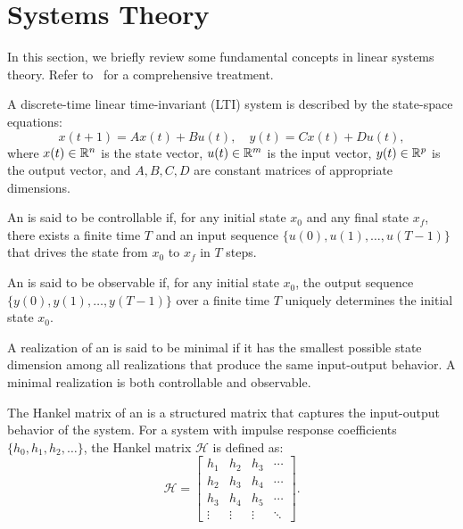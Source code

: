 \section{Systems Theory}
In this section, we briefly review some fundamental concepts in linear systems theory. Refer to~\cite{hespanha} for a comprehensive treatment.

\begin{definition}
 \label{def:lti}
    A discrete-time linear time-invariant (LTI) system is described by the state-space equations:
    \[
        x(t+1) = A x(t) + B u(t), \quad y(t) = C x(t) + D u(t),
    \]
    where $x(t) \in \mathbb{R}^n$ is the state vector, $u(t) \in \mathbb{R}^m$ is the input vector, $y(t) \in \mathbb{R}^p$ is the output vector, and $A, B, C, D$ are constant matrices of appropriate dimensions.
\end{definition}

\begin{definition}
[Controllability]
    An  is said to be controllable if, for any initial state $x_0$ and any final state $x_f$, there exists a finite time $T$ and an input sequence $\{u(0), u(1), \ldots, u(T-1)\}$ that drives the state from $x_0$ to $x_f$ in $T$ steps.
\end{definition}

\begin{definition}
[Observability]
    An  is said to be observable if, for any initial state $x_0$, the output sequence $\{y(0), y(1), \ldots, y(T-1)\}$ over a finite time $T$ uniquely determines the initial state $x_0$.
\end{definition}  

\begin{definition}
    A realization of an  is said to be minimal if it has the smallest possible state dimension among all realizations that produce the same input-output behavior. A minimal realization is both controllable and observable.
\end{definition}

\begin{definition}
    The Hankel matrix of an  is a structured matrix that captures the input-output behavior of the system. For a system with impulse response coefficients $\{h_0, h_1, h_2, \ldots\}$, the Hankel matrix $\mathcal{H}$ is defined as:
    \[
        \mathcal{H} = \begin{bmatrix}
        h_1 & h_2 & h_3 & \cdots \\
        h_2 & h_3 & h_4 & \cdots \\
        h_3 & h_4 & h_5 & \cdots \\
        \vdots & \vdots & \vdots & \ddots
        \end{bmatrix}.
    \]
\end{definition}

